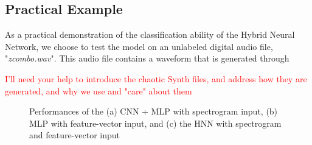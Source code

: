 \documentclass[conference,onecolumn,letterpaper]{IEEEtran}
\begin{document}

\subsection{Practical Example}
\label{subsec:Example}

As a practical demonstration of the classification ability of the Hybrid Neural Network, we choose to test the model on an unlabeled digital audio file, "\textit{zcombo.wav}". This audio file contains a waveform that is generated through 

\textcolor{red}{I'll need your help to introduce the chaotic Synth files, and address how they are generated, and why we use and "care" about them}

\begin{figure}[H]
    \centering
    \caption{Performances of the (a) CNN + MLP with spectrogram input, (b) MLP with feature-vector input, and (c) the HNN with spectrogram and feature-vector input}
    \label{fig:ConfScores}
\end{figure}
\end{document}
